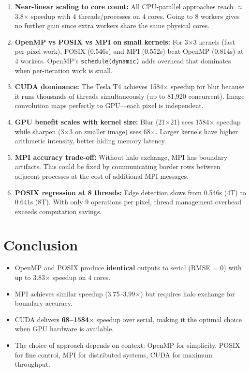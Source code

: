\documentclass[12pt, a4paper]{article}
\begin{document}
\begin{enumerate}
    \item \textbf{Near-linear scaling to core count:} All CPU-parallel approaches reach $\approx$3.8$\times$ speedup with 4 threads/processes on 4 cores. Going to 8 workers gives no further gain since extra workers share the same physical cores.

    \item \textbf{OpenMP vs POSIX vs MPI on small kernels:} For 3$\times$3 kernels (fast per-pixel work), POSIX (0.546s) and MPI (0.552s) beat OpenMP (0.814s) at 4 workers. OpenMP's \texttt{schedule(dynamic)} adds overhead that dominates when per-iteration work is small.

    \item \textbf{CUDA dominance:} The Tesla T4 achieves 1584$\times$ speedup for blur because it runs thousands of threads simultaneously (up to 81,920 concurrent). Image convolution maps perfectly to GPU---each pixel is independent.

    \item \textbf{GPU benefit scales with kernel size:} Blur (21$\times$21) sees 1584$\times$ speedup while sharpen (3$\times$3 on smaller image) sees 68$\times$. Larger kernels have higher arithmetic intensity, better hiding memory latency.

    \item \textbf{MPI accuracy trade-off:} Without halo exchange, MPI has boundary artifacts. This could be fixed by communicating border rows between adjacent processes at the cost of additional MPI messages.

    \item \textbf{POSIX regression at 8 threads:} Edge detection slows from 0.546s (4T) to 0.641s (8T). With only 9 operations per pixel, thread management overhead exceeds computation savings.
\end{enumerate}

\section{Conclusion}

\begin{itemize}
    \item OpenMP and POSIX produce \textbf{identical} outputs to serial (RMSE = 0) with up to 3.83$\times$ speedup on 4 cores.
    \item MPI achieves similar speedup (3.75--3.99$\times$) but requires halo exchange for boundary accuracy.
    \item CUDA delivers \textbf{68--1584$\times$} speedup over serial, making it the optimal choice when GPU hardware is available.
    \item The choice of approach depends on context: OpenMP for simplicity, POSIX for fine control, MPI for distributed systems, CUDA for maximum throughput.
\end{itemize}
\end{document}
